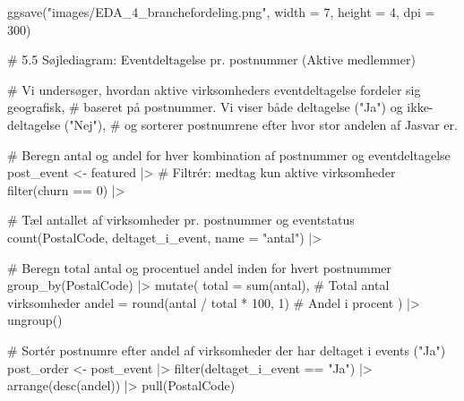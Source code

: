 \documentclass[
  11pt,
  letterpaper,
  DIV=11,
  numbers=noendperiod]{scrartcl}
\newenvironment{Shaded}{\begin{snugshade}}{\end{snugshade}}
\newcommand{\AttributeTok}[1]{\textcolor[rgb]{0.40,0.45,0.13}{#1}}
\newcommand{\CommentTok}[1]{\textcolor[rgb]{0.37,0.37,0.37}{#1}}
\newcommand{\DecValTok}[1]{\textcolor[rgb]{0.68,0.00,0.00}{#1}}
\newcommand{\FunctionTok}[1]{\textcolor[rgb]{0.28,0.35,0.67}{#1}}
\newcommand{\NormalTok}[1]{\textcolor[rgb]{0.00,0.23,0.31}{#1}}
\newcommand{\OtherTok}[1]{\textcolor[rgb]{0.00,0.23,0.31}{#1}}
\newcommand{\SpecialCharTok}[1]{\textcolor[rgb]{0.37,0.37,0.37}{#1}}
\newcommand{\StringTok}[1]{\textcolor[rgb]{0.13,0.47,0.30}{#1}}
\begin{document}
\begin{Shaded}
\begin{Highlighting}[]
\FunctionTok{ggsave}\NormalTok{(}\StringTok{"images/EDA\_4\_branchefordeling.png"}\NormalTok{, }\AttributeTok{width =} \DecValTok{7}\NormalTok{, }\AttributeTok{height =} \DecValTok{4}\NormalTok{, }\AttributeTok{dpi =} \DecValTok{300}\NormalTok{)}


\CommentTok{\# 5.5 Søjlediagram: Eventdeltagelse pr. postnummer (Aktive medlemmer)}


\CommentTok{\# Vi undersøger, hvordan aktive virksomheders eventdeltagelse fordeler sig geografisk,}
\CommentTok{\# baseret på postnummer. Vi viser både deltagelse ("Ja") og ikke{-}deltagelse ("Nej"),}
\CommentTok{\# og sorterer postnumrene efter hvor stor andelen af \textquotesingle{}Ja\textquotesingle{}{-}svar er.}

\CommentTok{\# Beregn antal og andel for hver kombination af postnummer og eventdeltagelse}
\NormalTok{post\_event }\OtherTok{\textless{}{-}}\NormalTok{ featured }\SpecialCharTok{|\textgreater{}} 
  \CommentTok{\# Filtrér: medtag kun aktive virksomheder}
  \FunctionTok{filter}\NormalTok{(churn }\SpecialCharTok{==} \DecValTok{0}\NormalTok{) }\SpecialCharTok{|\textgreater{}} 
  
  \CommentTok{\# Tæl antallet af virksomheder pr. postnummer og eventstatus}
  \FunctionTok{count}\NormalTok{(PostalCode, deltaget\_i\_event, }\AttributeTok{name =} \StringTok{"antal"}\NormalTok{) }\SpecialCharTok{|\textgreater{}} 
  
  \CommentTok{\# Beregn total antal og procentuel andel inden for hvert postnummer}
  \FunctionTok{group\_by}\NormalTok{(PostalCode) }\SpecialCharTok{|\textgreater{}} 
  \FunctionTok{mutate}\NormalTok{(}
    \AttributeTok{total =} \FunctionTok{sum}\NormalTok{(antal),                              }\CommentTok{\# Total antal virksomheder}
    \AttributeTok{andel =} \FunctionTok{round}\NormalTok{(antal }\SpecialCharTok{/}\NormalTok{ total }\SpecialCharTok{*} \DecValTok{100}\NormalTok{, }\DecValTok{1}\NormalTok{)            }\CommentTok{\# Andel i procent}
\NormalTok{  ) }\SpecialCharTok{|\textgreater{}} 
  \FunctionTok{ungroup}\NormalTok{()}

\CommentTok{\# Sortér postnumre efter andel af virksomheder der har deltaget i events ("Ja")}
\NormalTok{post\_order }\OtherTok{\textless{}{-}}\NormalTok{ post\_event }\SpecialCharTok{|\textgreater{}} 
  \FunctionTok{filter}\NormalTok{(deltaget\_i\_event }\SpecialCharTok{==} \StringTok{"Ja"}\NormalTok{) }\SpecialCharTok{|\textgreater{}} 
  \FunctionTok{arrange}\NormalTok{(}\FunctionTok{desc}\NormalTok{(andel)) }\SpecialCharTok{|\textgreater{}} 
  \FunctionTok{pull}\NormalTok{(PostalCode)}


\end{Highlighting}
\end{Shaded}
\end{document}
